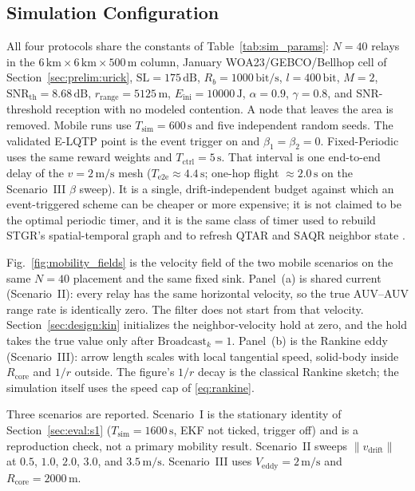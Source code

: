 \subsection{Simulation Configuration}
\label{sec:eval:cfg}

All four protocols share the constants of
Table~\ref{tab:sim_params}: $N=40$ relays in the
$6\,\mathrm{km}\times 6\,\mathrm{km}\times 500\,\mathrm{m}$ column,
January WOA23/GEBCO/Bellhop cell of
Section~\ref{sec:prelim:urick}, $\mathrm{SL}=175\,\mathrm{dB}$,
$R_b=1000\,\mathrm{bit/s}$, $l=400\,\mathrm{bit}$, $M=2$,
$\mathrm{SNR}_{\mathrm{th}}=8.68\,\mathrm{dB}$,
$r_{\mathrm{range}}=5125\,\mathrm{m}$, $E_{\mathrm{ini}}=10000\,\mathrm{J}$,
$\alpha=0.9$, $\gamma=0.8$, and SNR-threshold reception with no
modeled contention.
A node that leaves the area is removed.
Mobile runs use $T_{\mathrm{sim}}=600\,\mathrm{s}$ and
five independent random seeds.
The validated E-LQTP point is the event trigger on and
$\beta_1=\beta_2=0$.
Fixed-Periodic uses the same reward weights and
$T_{\mathrm{ctrl}}=5\,\mathrm{s}$.
That interval is one end-to-end delay of the $v=2\,\mathrm{m/s}$
mesh ($T_{\mathrm{e2e}}\approx 4.4\,\mathrm{s}$; one-hop flight
$\approx 2.0\,\mathrm{s}$ on the Scenario~III $\beta$ sweep).
It is a single, drift-independent budget against which an
event-triggered scheme can be cheaper or more expensive; it is
not claimed to be the optimal periodic timer, and it is the same
class of timer used to rebuild STGR's spatial-temporal graph
\cite{xu2025stgr} and to refresh QTAR and SAQR neighbor state
\cite{nandyala2023qtar,zhang2025saqr}.



Fig.~\ref{fig:mobility_fields} is the velocity field of the two
mobile scenarios on the same $N=40$ placement and the same fixed
sink.
Panel~(a) is shared current (Scenario~II): every relay has the same
horizontal velocity, so the true AUV--AUV range rate is identically
zero.
The filter does not start from that velocity.
Section~\ref{sec:design:kin} initializes the neighbor-velocity hold
at zero, and the hold takes the true value only after
$\mathrm{Broadcast}_k=1$.
Panel~(b) is the Rankine eddy (Scenario~III): arrow length scales
with local tangential speed, solid-body inside $R_{\mathrm{core}}$
and $1/r$ outside.
The figure's $1/r$ decay is the classical Rankine sketch; the
simulation itself uses the speed cap of \eqref{eq:rankine}.

Three scenarios are reported.
Scenario~I is the stationary identity of
Section~\ref{sec:eval:s1} ($T_{\mathrm{sim}}=1600\,\mathrm{s}$,
EKF not ticked, trigger off) and is a reproduction check, not a
primary mobility result.
Scenario~II sweeps $\|v_{\mathrm{drift}}\|$ at
$0.5$, $1.0$, $2.0$, $3.0$, and $3.5\,\mathrm{m/s}$.
Scenario~III uses $V_{\mathrm{eddy}}=2\,\mathrm{m/s}$ and
$R_{\mathrm{core}}=2000\,\mathrm{m}$.
